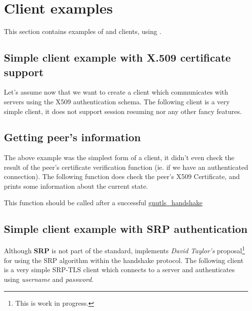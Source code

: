 \documentclass{book}
\begin{document}
















\section{Client examples}
This section contains examples of \tls{} and \ssl{} clients, using \gnutls{}. 

\subsection{Simple client example with X.509 certificate support}
Let's assume now that we want to create a client which communicates
with servers using the X509 authentication schema. The following client
is a very simple \tls{} client, it does not support session resuming nor
any other fancy features.


\subsection{Getting peer's information}
\par The above example was the simplest form of a client, it didn't even check
the result of the peer's certificate verification function (ie. if we have
an authenticated connection). The following function does check the peer's X509
Certificate, and prints some information about the current state.
\par
This function should be called after a successful
\hyperref{gnutls\_handshake()}{gnutls\_handshake() (see Section }{)}{gnutls_handshake}





\subsection{Simple client example with SRP authentication}
Although {\bf SRP} is not part of the \tls{} standard, \gnutls{} implements
{\it David Taylor's} proposal\footnote{This is work in progress.}  for using the SRP algorithm
within the \tls{} handshake protocol. The following client
is a very simple SRP-TLS client which connects to a server 
and authenticates using {\it username} and {\it password}.
\end{document}
